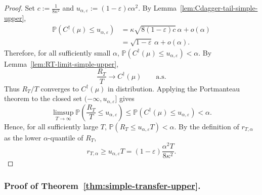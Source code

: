 \documentclass[10pt]{article}
\theoremstyle{plain}
\begin{document}
\begin{proof}
Set $c:=\frac{1}{8\kappa^2}$ and $u_{\alpha,\varepsilon}:=(1-\varepsilon)c\alpha^2$.
By Lemma~\ref{lem:Cdagger-tail-simple-upper},
\[
\begin{aligned}
    \mathbb P(C^\dagger(\mu)\le u_{\alpha,\varepsilon})
    &=
    \kappa\sqrt{8(1-\varepsilon)c}\,\alpha+o(\alpha)  \\
    &=
    \sqrt{1-\varepsilon}\,\alpha+o(\alpha).
\end{aligned}
\]
Therefore, for all sufficiently small \(\alpha\),
    $\mathbb P(C^\dagger(\mu)\le u_{\alpha,\varepsilon})<\alpha$.
By Lemma~\ref{lem:RT-limit-simple-upper},
\[
    \frac{R_T}{T}\to C^\dagger(\mu)
    \qquad\text{a.s.}
\]
Thus \(R_T/T\) converges to \(C^\dagger(\mu)\) in distribution.  Applying the
Portmanteau theorem to the closed set $(-\infty,u_{\alpha,\varepsilon}]$
gives
\[
    \limsup_{T\to\infty}
    \mathbb P\left(
        \frac{R_T}{T}\le u_{\alpha,\varepsilon}
    \right)
    \le
    \mathbb P(C^\dagger(\mu)\le u_{\alpha,\varepsilon})
    <
    \alpha.
\]
Hence, for all sufficiently large \(T\),
    $\mathbb P(R_T\le u_{\alpha,\varepsilon}T)<\alpha$.
By the definition of \(r_{T,\alpha}\) as the lower \(\alpha\)-quantile of
\(R_T\),
\[
    r_{T,\alpha}
    \ge
    u_{\alpha,\varepsilon}T
    =
    (1-\varepsilon)\frac{\alpha^2T}{8\kappa^2}. 
\]

\end{proof}

\subsubsection{Proof of Theorem~\ref{thm:simple-transfer-upper}.}
\end{document}
